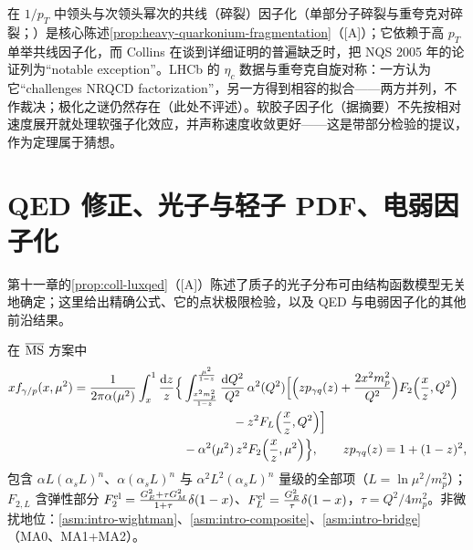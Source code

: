 \begin{remark}[唯象张力与替代方案]\label{rem:front-quarkonium-alternatives}
在 $1/p_T$ 中领头与次领头幂次的共线（碎裂）因子化（单部分子碎裂与重夸克对碎裂；\cite{Kang:2011mg,Kang:2014tta,Kang:2014pya,Fleming:2012wy,Ma:2013yla,Ma:2014eja,Bodwin:2014gia}）是核心陈述\cref{prop:heavy-quarkonium-fragmentation}（[A]）；它依赖于高 $p_T$ 单举共线因子化，而 Collins 在谈到详细证明的普遍缺乏时，把 NQS 2005 年的论证列为“notable exception”\cite[第~14.7~节，第~570--571~页]{Collins2011}。LHCb 的 $\eta_c$ 数据与重夸克自旋对称：一方认为它“challenges NRQCD factorization”\cite{Butenschoen:2014dra}，另一方得到相容的拟合\cite{Han:2014jya,Zhang:2014ybe}——两方并列，不作裁决；极化之谜仍然存在（此处不评述）。软胶子因子化\cite{Ma:2017xno}（据摘要）不先按相对速度展开就处理软强子化效应，并声称速度收敛更好——这是带部分检验的提议，作为定理属于猜想。
\end{remark}

\section{QED 修正、光子与轻子 PDF、电弱因子化}\label{sec:front-qed}

第十一章的\cref{prop:coll-luxqed}（[A]）陈述了质子的光子分布可由结构函数模型无关地确定；这里给出精确公式、它的点状极限检验，以及 QED 与电弱因子化的其他前沿结果。

\begin{theorem}\label{thm:front-luxqed}
在 $\overline{\mathrm{MS}}$ 方案中
\begin{equation}\label{eq:front-luxqed}
\begin{split}
xf_{\gamma/p}(x,\mu^2)=\frac{1}{2\pi\alpha(\mu^2)}\int_x^1\frac{\mathrm{d} z}{z}\Bigl\{&\int_{\frac{x^2m_p^2}{1-z}}^{\frac{\mu^2}{1-z}}\frac{\mathrm{d} Q^2}{Q^2}\,\alpha^2(Q^2)\Bigl[\Bigl(zp_{\gamma q}(z)+\frac{2x^2m_p^2}{Q^2}\Bigr)F_2\Bigl(\frac xz,Q^2\Bigr)\\
&\qquad\qquad-z^2F_L\Bigl(\frac xz,Q^2\Bigr)\Bigr]\\
&-\alpha^2(\mu^2)\,z^2F_2\Bigl(\frac xz,\mu^2\Bigr)\Bigr\},\qquad zp_{\gamma q}(z)=1+(1-z)^2,
\end{split}
\end{equation}
包含 $\alpha L(\alpha_sL)^n$、$\alpha(\alpha_sL)^n$ 与 $\alpha^2L^2(\alpha_sL)^n$ 量级的全部项（$L=\ln\mu^2/m_p^2$）；$F_{2,L}$ 含弹性部分 $F_2^{\rm el}=\frac{G_E^2+\tau G_M^2}{1+\tau}\delta(1-x)$、$F_L^{\rm el}=\frac{G_E^2}{\tau}\delta(1-x)$，$\tau=Q^2/4m_p^2$\cite[式~(6)]{Manohar:2016nzj}。非微扰地位：\cref{asm:intro-wightman}、\cref{asm:intro-composite}、\cref{asm:intro-bridge}（MA0、MA1+MA2）。
\end{theorem}

